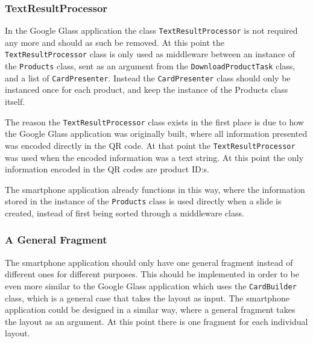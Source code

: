 

\subsubsection{TextResultProcessor}
In the Google Glass application the class \texttt{TextResultProcessor} is not required any more and should as such be removed. At this point the \texttt{TextResultProcessor} class is only used as middleware between an instance of the \texttt{Products} class, sent as an argument from the \texttt{DownloadProductTask} class, and a list of \texttt{CardPresenter}. Instead the \texttt{CardPresenter} class should only be instanced once for each product, and keep the instance of the Products class itself.

The reason the \texttt{TextResultProcessor} class exists in the first place is due to how the Google Glass application was originally built, where all information presented was encoded directly in the QR code. At that point the \texttt{TextResultProcessor} was used when the encoded information was a text string. At this point the only information encoded in the QR codes are product ID:s.

The smartphone application already functions in this way, where the information stored in the instance of the \texttt{Products} class is used directly when a slide is created, instead of first being sorted through a middleware class.


\subsubsection{A General Fragment}
The smartphone application should only have one general fragment instead of different ones for different purposes. This should be implemented in order to be even more similar to the Google Glass application which uses the \texttt{CardBuilder} class, which is a general case that takes the layout as input. The smartphone application could be designed in a similar way, where a general fragment takes the layout as an argument. At this point there is one fragment for each individual layout.